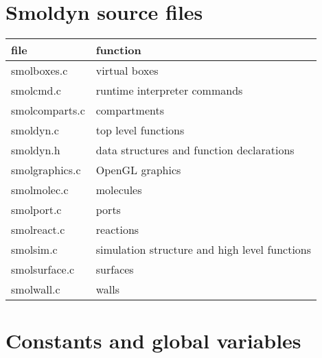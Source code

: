 \documentclass {book}
\begin{document}
\section{Smoldyn source files}

\begin{longtable}[c]{ll}
file & function\\
\hline
smolboxes.c & virtual boxes\\
smolcmd.c & runtime interpreter commands\\
smolcomparts.c & compartments\\
smoldyn.c & top level functions\\
smoldyn.h & data structures and function declarations\\
smolgraphics.c & OpenGL graphics\\
smolmolec.c & molecules\\
smolport.c & ports\\
smolreact.c & reactions\\
smolsim.c & simulation structure and high level functions\\
smolsurface.c & surfaces\\
smolwall.c & walls\\
\end{longtable}

\section{Constants and global variables}
\end{document}
